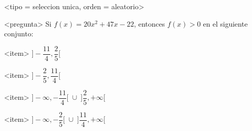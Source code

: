 <tipo = seleccion unica, orden = aleatorio>

<pregunta>
Si $f(x) = 20x^2 +47x -22$, entonces $f(x) > 0$ en el siguiente conjunto:


<item>
$\bigg]-\dfrac{11}{4}, \dfrac{2}{5}\bigg[$

<item>
$\bigg]-\dfrac{2}{5}, \dfrac{11}{4}\bigg[$

<item>
$\bigg]{-}\infty, -\dfrac{11}{4}\bigg[\;\cup\; \bigg]\dfrac{2}{5},+\infty\bigg[$

<item>
$\bigg]{-}\infty, -\dfrac{2}{5}\bigg[\;\cup\; \bigg]\dfrac{11}{4},+\infty\bigg[$

 

